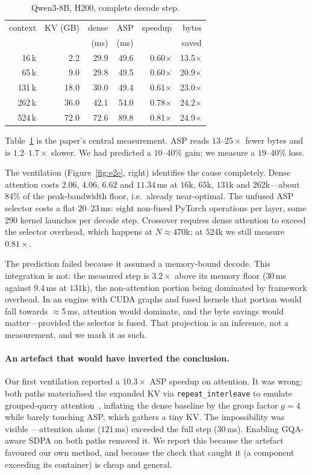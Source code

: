\documentclass[sigconf,nonacm,11pt]{acmart}
\begin{document}
\begin{table}[t]
\caption{Qwen3-8B, H200, complete decode step.}
\label{tab:e2e}
\small
\setlength{\tabcolsep}{4.5pt}
\begin{tabular}{rrrrrr}
\toprule
context & KV (GB) & dense & ASP & speedup & bytes \\
        &         & (ms)  & (ms) &         & saved \\
\midrule
16\,k  &  2.2 & 29.9 & 49.6 & 0.60$\times$ & 13.5$\times$ \\
65\,k  &  9.0 & 29.8 & 49.5 & 0.60$\times$ & 20.9$\times$ \\
131\,k & 18.0 & 30.0 & 49.4 & 0.61$\times$ & 23.0$\times$ \\
262\,k & 36.0 & 42.1 & 54.0 & 0.78$\times$ & 24.2$\times$ \\
524\,k & 72.0 & 72.6 & 89.8 & 0.81$\times$ & 24.9$\times$ \\
\bottomrule
\end{tabular}
\end{table}

Table~\ref{tab:e2e} is the paper's central measurement. ASP reads $13$--$25\times$
fewer bytes and is $1.2$--$1.7\times$ slower. We had predicted a $10$--$40\%$ gain;
we measure a $19$--$40\%$ loss.

The ventilation (Figure~\ref{fig:e2e}, right) identifies the cause completely.
Dense attention costs $2.06$, $4.06$, $6.62$ and $11.34$\,ms at $16$k, $65$k,
$131$k and $262$k---about $84\%$ of the peak-bandwidth floor, i.e.\ already
near-optimal. The unfused ASP selector costs a flat $20$--$23$\,ms: eight
non-fused PyTorch operations per layer, some 290 kernel launches per decode step.
Crossover requires dense attention to exceed the selector overhead, which happens
at $N\approx470$k; at $524$k we still measure $0.81\times$.

The prediction failed because it assumed a memory-bound decode. This integration
is not: the measured step is $3.2\times$ above its memory floor ($30$\,ms against
$9.4$\,ms at $131$k), the non-attention portion being dominated by framework
overhead. In an engine with CUDA graphs and fused kernels that portion would fall
towards $\approx$5\,ms, attention would dominate, and the byte savings would
matter---provided the selector is fused. That projection is an inference, not a
measurement, and we mark it as such.

\paragraph{An artefact that would have inverted the conclusion.} Our first
ventilation reported a $10.3\times$ ASP speedup on attention. It was wrong: both
paths materialised the expanded KV via \texttt{repeat\_interleave} to emulate
grouped-query attention~\cite{ainslie2023gqa}, inflating the dense baseline by the group factor $g=4$
while barely touching ASP, which gathers a tiny KV. The impossibility was visible
---attention alone ($121$\,ms) exceeded the full step ($30$\,ms). Enabling
GQA-aware SDPA on both paths removed it. We report this because the artefact
favoured our own method, and because the check that caught it (a component
exceeding its container) is cheap and general.
\end{document}
